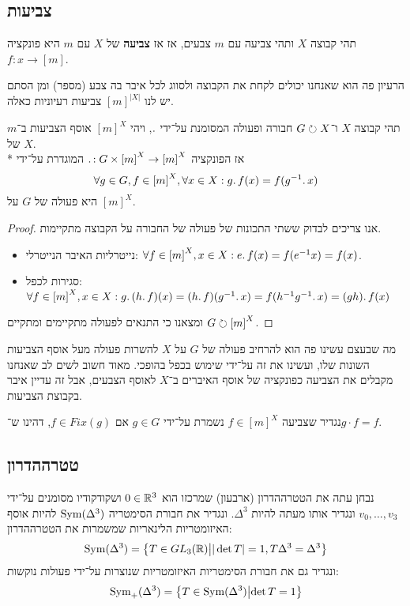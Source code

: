 \subsection{צביעות}
\begin{definition}[צביעה]
	תהי קבוצה $X$ ותהי צביעה עם $m$ צבעים, אז אז \textbf{צביעה} של $X$ עם $m$ היא פונקציה $f : x \to [m]$.
\end{definition}
הרעיון פה הוא שאנחנו יכולים לקחת את הקבוצה ולסווג לכל איבר בה צבע (מספר) ומן הסתם יש לנו ${[m]}^{|X|}$ צביעות רעיוניות כאלה.
\begin{proposition}
	תהי קבוצה $X$ ו־$G \circlearrowright X$ חבורה ופעולה המסומנת על־ידי $\ldotp$, ויהי ${[m]}^X$ אוסף הצביעות ב־$m$ של $X$. \\*
	אז הפונקציה $\ldotp : G \times {[m]}^X \to {[m]}^X$ המוגדרת על־ידי
	\[
		\forall g \in G, f \in {[m]}^X, \forall x \in X : g \ldotp f(x) = f(g^{-1} \ldotp x)
	\]
	היא פעולה של $G$ על ${[m]}^X$.
\end{proposition}
\begin{proof}
	אנו צריכים לבדוק ששתי התכונות של פעולה של החבורה על הקבוצה מתקיימות.
	\begin{itemize}
		\item נייטרליות האיבר הנייטרלי: $\forall f \in {[m]}^X, x \in X : e \ldotp f(x) = f(e^{-1} x) = f(x)$.
		\item סגירות לכפל: $\forall f \in {[m]}^X, x \in X : g \ldotp (h \ldotp f)(x) = (h \ldotp f)(g^{-1} \ldotp x) = f(h^{-1} g^{-1} \ldotp x) = (gh) \ldotp f(x)$
	\end{itemize}
	ומצאנו כי התנאים לפעולה מתקיימים ומתקיים $G \circlearrowright {[m]}^X$.
\end{proof}
מה שבעצם עשינו פה הוא להרחיב פעולה של $G$ על $X$ להשרות פעולה מעל אוסף הצביעות השונות שלו, ועשינו את זה על־ידי שימוש בכפל בהופכי.
מאוד חשוב לשים לב שאנחנו מקבלים את הצביעה כפונקציה של אוסף האיברים ב־$X$ לאוסף הצבעים, אבל זה עדיין איבר בקבוצת הצביעות.

\begin{definition}
	נגדיר שצביעה $f \in {[m]}^X$ נשמרת על־ידי $g \in G$ אם $f \in Fix(g)$, דהינו ש־$g \cdot f = f$.
\end{definition}

\subsection{טטרההדרון}
נבחן עתה את הטטרההדרון (ארבעון) שמרכזו הוא $0 \in \mathbb{R}^3$ ושקודקודיו מסומנים על־ידי $v_0, \dots, v_3$ ונגדיר אותו מעתה להיות $\Delta^3$.
ונגדיר את חבורת הסימטריה $\operatorname{Sym}(\Delta^3)$ להיות אוסף האיזומטריות הלינאריות שמשמרות את הטטרההדרון:
\[
	\operatorname{Sym}(\Delta^3) = \left\{ T \in GL_3(\mathbb{R}) \middle| |\det T| = 1, T\Delta^3 = \Delta^3\right\}
\]
ונגדיר גם את חבורת הסימטריות האיזומטריות שנוצרות על־ידי פעולות נוקשות:
\[
	\operatorname{Sym}_+(\Delta^3) = \left\{ T \in \operatorname{Sym}(\Delta^3) \middle| \det T = 1 \right\}
\]

